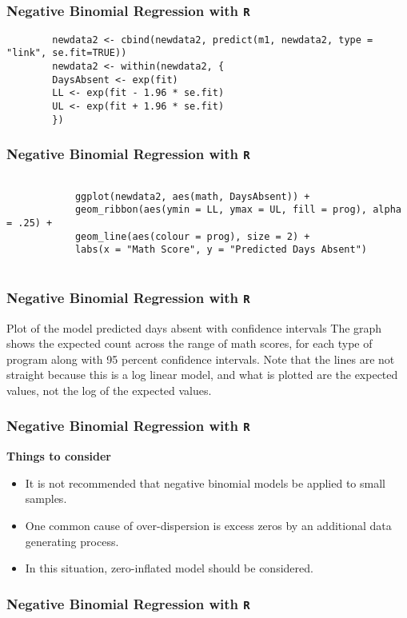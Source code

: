 \documentclass[00-GLMregslides.tex]{subfiles}
\begin{document}
	\begin{frame}[fragile]
	\frametitle{Negative Binomial Regression with \texttt{R} }
	\Large
	
	\begin{verbatim}
		newdata2 <- cbind(newdata2, predict(m1, newdata2, type = "link", se.fit=TRUE))
		newdata2 <- within(newdata2, {
		DaysAbsent <- exp(fit)
		LL <- exp(fit - 1.96 * se.fit)
		UL <- exp(fit + 1.96 * se.fit)
		})
	\end{verbatim}

\end{frame}


	\begin{frame}[fragile]
		\frametitle{Negative Binomial Regression with \texttt{R} }
		\large
		
		\begin{framed}
			\begin{verbatim}
			
			ggplot(newdata2, aes(math, DaysAbsent)) +
			geom_ribbon(aes(ymin = LL, ymax = UL, fill = prog), alpha = .25) +
			geom_line(aes(colour = prog), size = 2) +
			labs(x = "Math Score", y = "Predicted Days Absent")
			
			\end{verbatim}	
		\end{framed}
		

\begin{frame}[fragile]
	\frametitle{Negative Binomial Regression with \texttt{R} }
	\Large
	
	Plot of the model predicted days absent with confidence intervals
	The graph shows the expected count across the range of math scores, for each type of program along with 95 percent confidence intervals. Note that the lines are not straight because this is a log linear model, and what is plotted are the expected values, not the log of the expected values.
\end{frame}
\begin{frame}[fragile]
	\frametitle{Negative Binomial Regression with \texttt{R} }
	\Large
	
	\textbf{Things to consider}
	\begin{itemize}
	\item It is not recommended that negative binomial models be applied to small samples.
	\item One common cause of over-dispersion is excess zeros by an additional data generating process. 
	\item In this situation, zero-inflated model should be considered.
	\end{itemize}
\end{frame}
\begin{frame}[fragile]
	\frametitle{Negative Binomial Regression with \texttt{R} }
	\Large
	

\end{frame}
\end{frame}
\end{document}
